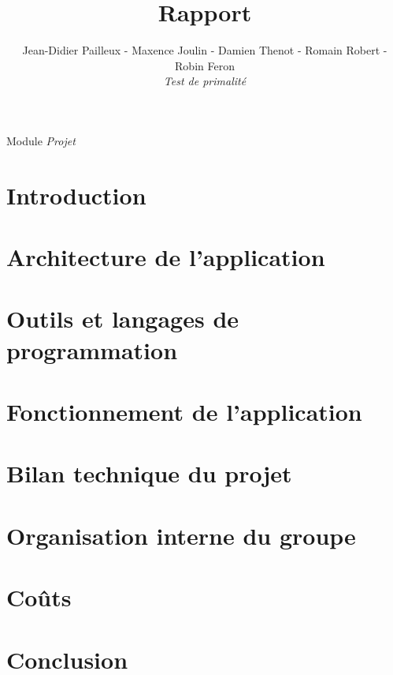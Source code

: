 

\title{\vspace{\fill}\textbf{\Huge Rapport}}
\author{Jean-Didier Pailleux - Maxence Joulin - Damien Thenot - Romain Robert - Robin Feron 
	\vspace{2em}\\
	\textit{Test de primalité}
	\vspace{2em}
}


\clearpage
\maketitle\vspace{9em}
\begin{flushright}Module \textit{Projet}\end{flushright}
\newpage
\tableofcontents
\newpage\clearpage{}

	\section*{Introduction}
	
	\section{Architecture de l'application}

	\section{Outils et langages de programmation}
			
	\section{Fonctionnement de l'application}

	\section{Bilan technique du projet}
				
	\section{Organisation interne du groupe}

	\section{Coûts}

	\section*{Conclusion}

